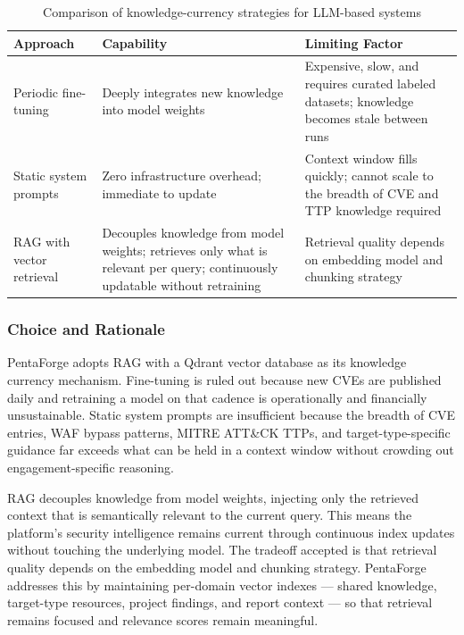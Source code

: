 \documentclass[12pt,a4paper]{report}
\begin{document}
\begin{table}[H]
    \centering
    \renewcommand{\arraystretch}{1.35}
    \begin{tabular}{|p{}|p{}|p{}|}
        \hline
        \textbf{Approach} & \textbf{Capability} & \textbf{Limiting Factor} \\
        \hline
        Periodic fine-tuning & Deeply integrates new knowledge into model
        weights & Expensive, slow, and requires curated labeled datasets;
        knowledge becomes stale between runs \\
        \hline
        Static system prompts & Zero infrastructure overhead; immediate to
        update & Context window fills quickly; cannot scale to the breadth
        of CVE and TTP knowledge required \\
        \hline
        RAG with vector retrieval & Decouples knowledge from model weights;
        retrieves only what is relevant per query; continuously updatable
        without retraining & Retrieval quality depends on embedding model
        and chunking strategy \\
        \hline
    \end{tabular}
    \caption{Comparison of knowledge-currency strategies for LLM-based systems}
    \label{tab:rag_approaches}
\end{table}

\subsubsection{Choice and Rationale}

PentaForge adopts RAG with a Qdrant vector database as its knowledge
currency mechanism. Fine-tuning is ruled out because new CVEs are published
daily and retraining a model on that cadence is operationally and
financially unsustainable. Static system prompts are insufficient because
the breadth of CVE entries, WAF bypass patterns, MITRE ATT\&CK TTPs, and
target-type-specific guidance far exceeds what can be held in a context
window without crowding out engagement-specific reasoning.

RAG decouples knowledge from model weights, injecting only the retrieved
context that is semantically relevant to the current query. This means the
platform's security intelligence remains current through continuous index
updates without touching the underlying model. The tradeoff accepted is
that retrieval quality depends on the embedding model and chunking strategy.
PentaForge addresses this by maintaining per-domain vector indexes ---
shared knowledge, target-type resources, project findings, and report
context --- so that retrieval remains focused and relevance scores remain
meaningful.
\end{document}
